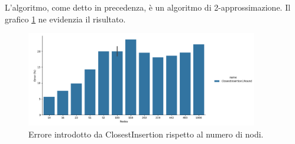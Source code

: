 L'algoritmo, come detto in precedenza, è un algoritmo di 2-approssimazione. Il grafico
\ref{fig:closest-insertion-1-round-accuracy-error} ne evidenzia il
risultato.

\begin{figure}[!ht]
    \centering

    \includegraphics[width=0.9\textwidth]{./images/ClosestInsertion1Round__approximation_error_.png}

    \caption{Errore introdotto da ClosestInsertion rispetto al numero di nodi.}
    \label{fig:closest-insertion-1-round-accuracy-error}
\end{figure}
